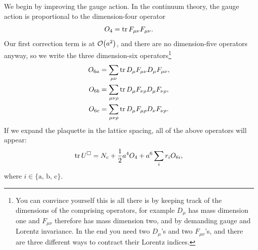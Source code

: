 We begin by improving the gauge action. In the continuum theory, the gauge
action is proportional to the dimension-four operator
\begin{equation}
  O_4 = \tr F_{\mu\nu}F_{\mu\nu}.
\end{equation}
Our first correction term is at $\order{a^2}$, and there are no dimension-five
operators anyway, so we write the three dimension-six operators\footnote{You 
can convince yourself this is all there is by keeping track of the
dimensions of the comprising operators, for example $D_\mu$ has mass dimension
one and $F_{\mu\nu}$ therefore has mass dimension two, and by demanding gauge
and Lorentz invariance. In the end you need two $D_\mu$'s and two 
$F_{\mu\nu}$'s, and there are three different ways to contract their 
Lorentz indices.}
\begin{equation}\begin{aligned}
  O_{6a}&=\sum_{\mu\nu}\tr D_\mu F_{\mu\nu} D_\mu F_{\mu\nu},\\
  O_{6b}&=\sum_{\mu\nu\rho}\tr D_\mu F_{\nu\rho} D_\mu F_{\nu\rho},\\
  O_{6c}&=\sum_{\mu\nu\rho}\tr D_\mu F_{\mu\rho} D_\nu F_{\nu\rho}.
\end{aligned}\end{equation}
If we expand the plaquette in the lattice spacing, all of the above
operators will appear:
\begin{equation}
  \tr U^\square = N_c + \frac{1}{2}a^4O_4+a^6\sum_i r_iO_{6i},
\end{equation}
where $i\in\{\text{a, b, c}\}$.


